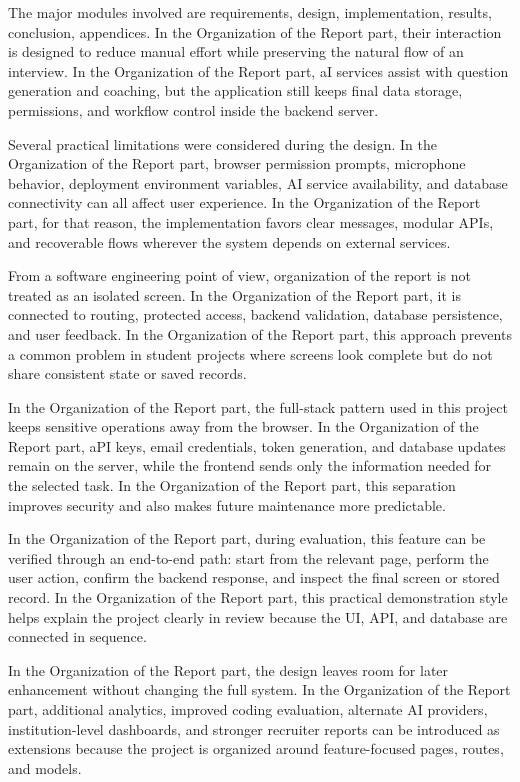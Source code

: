 \documentclass[12pt,a4paper]{report}
\begin{document}
The major modules involved are requirements, design, implementation, results, conclusion, appendices. In the Organization of the Report part, their interaction is designed to reduce manual effort while preserving the natural flow of an interview. In the Organization of the Report part, aI services assist with question generation and coaching, but the application still keeps final data storage, permissions, and workflow control inside the backend server.


Several practical limitations were considered during the design. In the Organization of the Report part, browser permission prompts, microphone behavior, deployment environment variables, AI service availability, and database connectivity can all affect user experience. In the Organization of the Report part, for that reason, the implementation favors clear messages, modular APIs, and recoverable flows wherever the system depends on external services.


From a software engineering point of view, organization of the report is not treated as an isolated screen. In the Organization of the Report part, it is connected to routing, protected access, backend validation, database persistence, and user feedback. In the Organization of the Report part, this approach prevents a common problem in student projects where screens look complete but do not share consistent state or saved records.


In the Organization of the Report part, the full-stack pattern used in this project keeps sensitive operations away from the browser. In the Organization of the Report part, aPI keys, email credentials, token generation, and database updates remain on the server, while the frontend sends only the information needed for the selected task. In the Organization of the Report part, this separation improves security and also makes future maintenance more predictable.


In the Organization of the Report part, during evaluation, this feature can be verified through an end-to-end path: start from the relevant page, perform the user action, confirm the backend response, and inspect the final screen or stored record. In the Organization of the Report part, this practical demonstration style helps explain the project clearly in review because the UI, API, and database are connected in sequence.


In the Organization of the Report part, the design leaves room for later enhancement without changing the full system. In the Organization of the Report part, additional analytics, improved coding evaluation, alternate AI providers, institution-level dashboards, and stronger recruiter reports can be introduced as extensions because the project is organized around feature-focused pages, routes, and models.
\end{document}
